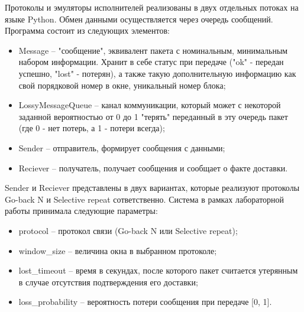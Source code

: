 Протоколы и эмуляторы исполнителей реализованы в двух отдельных потоках на языке Python. Обмен данными осуществляется через очередь сообщений. Программа состоит из следующих элементов:

\begin{itemize}
	\item Message -- "сообщение", эквивалент пакета с номинальным, минимальным набором информации. Хранит в себе статус при передаче ("ok" - передан успешно, "lost" - потерян), а также такую дополнительную информацию как свой порядковой номер в окне, уникальный номер блока; 
    \item LossyMessageQueue -- канал коммуникации, который может с некоторой заданной вероятностью от 0 до 1 "терять" переданный в эту очередь пакет (где 0 - нет потерь, а 1 - потери всегда); 
	\item Sender -- отправитель, формирует сообщения с данными;
	\item Reciever -- получатель, получает сообщения и сообщает о факте
	доставки.
\end{itemize}

Sender и Reciever представлены в двух вариантах, которые реализуют протоколы Go-back N и Selective repeat сответственно. Система в рамках лабораторной работы принимала следующие параметры:
\begin{itemize}
	\item protocol -- протокол связи (Go-back N или Selective repeat);
	\item window\_size -- величина окна в выбранном протоколе;
	\item lost\_timeout -- время в секундах, после которого пакет считается утерянным в случае отсутствия подтверждения его доставки;
	\item loss\_probability -- вероятность потери сообщения при передаче [0, 1].
\end{itemize}